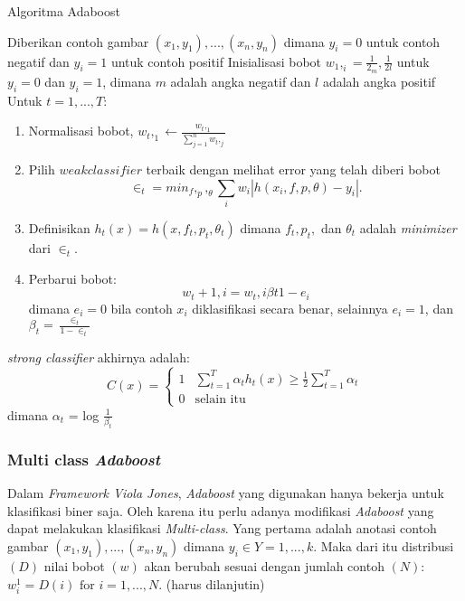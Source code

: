 \begin{algorithm}
  \caption{Algoritma Adaboost}
  \begin{algorithmic} [1]
    \State Diberikan contoh gambar $(x_1, y_1),...,(x_n, y_n)$ dimana 
    $y_i = 0$ untuk contoh negatif dan $y_i = 1$ untuk contoh positif
    \State Inisialisasi bobot $w_1,_i = \frac{1}{2_m}, \frac{1}{2l}$ 
    untuk $y_i = 0$ dan $y_i = 1$, dimana $m$ adalah angka negatif dan 
    $l$ adalah angka positif
    \State Untuk $t = 1,...,T$:
      \begin{enumerate}
        \item Normalisasi bobot, $w_t,_1 \gets \frac{w_t,_1}{\sum_{j=1}^{n} w_t,_j}$
        \item Pilih $weak classifier$ terbaik dengan melihat error yang telah diberi bobot
          \begin{equation}
            \in_t = min_f,_p,_\theta \sum_i w_i|h(x_i,f,p,\theta) - y_i|.
          \end{equation}
        \item Definisikan $h_t(x) = h(x,f_t,p_t,\theta_t)$ dimana $f_t,p_t,$ dan $\theta_t$ adalah \textit{minimizer} dari $\in_t$.
        \item Perbarui bobot:
          \begin{equation}
            w_t+1,i = w_t,i \beta{t}{1-e_i}
          \end{equation}
        dimana $e_i = 0$ bila contoh $x_i$ diklasifikasi secara benar, selainnya $e_i = 1$, dan $\beta_t = \frac{\in_t}{1-\in_t}$
      \end{enumerate}
      \State \textit{strong classifier} akhirnya adalah:
        \begin{equation}
          C(x) = \begin{cases}
            1 & \sum\limits_{t=1}^T \alpha_t h_t (x) \geq \frac{1}{2} \sum\limits_{t=1}^T \alpha_t \\
            0 & \text{selain itu}
          \end{cases}
        \end{equation}
      dimana $\alpha_t$ = log $\frac{1}{\beta_t}$ 
  \end{algorithmic}
\end{algorithm}

\subsubsection{Multi class \emph{Adaboost}}

Dalam \emph{Framework Viola Jones}, \emph{Adaboost} yang digunakan hanya bekerja untuk 
klasifikasi biner saja. Oleh karena itu perlu adanya modifikasi \emph{Adaboost} yang 
dapat melakukan klasifikasi \emph{Multi-class}. Yang pertama adalah anotasi 
contoh gambar $(x_1, y_1),...,(x_n, y_n)$ dimana $y_i \in Y = {1,...,k}$. 
Maka dari itu distribusi $(D)$ nilai bobot $(w)$ akan berubah sesuai dengan 
jumlah contoh $(N)$: $w^1_i = D(i) \text{ for } i=1,...,N$. (harus dilanjutin)


